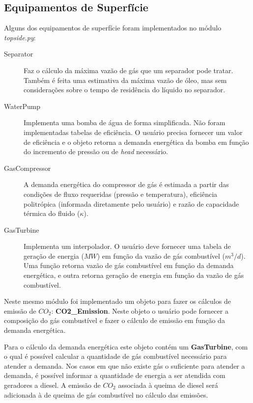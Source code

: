 \documentclass[final,5p]{elsarticle}
\numberwithin{equation}{section}
\begin{document}
    \subsection{Equipamentos de Superfície}

        Alguns dos equipamentos de superfície foram implementados no módulo \emph{topside.py}:

        \begin{description}
            \item[Separator] Faz o cálculo da máxima vazão de gás que um separador pode tratar. Também é feita uma estimativa da máxima vazão de óleo, mas sem considerações sobre o tempo de residência do líquido no separador.
            \item[WaterPump] Implementa uma bomba de água de forma simplificada. Não foram implementadas tabelas de eficiência. O usuário precisa fornecer um valor de eficiência e o objeto retorna a demanda energética da bomba em função do incremento de pressão ou de \emph{head} necessário.
            \item[GasCompressor] A demanda energética do compressor de gás é estimada a partir das condições de fluxo requeridas (pressão e temperatura), eficiência politrópica (informada diretamente pelo usuário) e razão de capacidade térmica do fluido ($\kappa$).
            \item[GasTurbine] Implementa um interpolador. O usuário deve fornecer uma tabela de geração de energia ($MW$) em função da vazão de gás combustível ($m^3/d$). Uma função retorna vazão de gás combustível em função da demanda energética, e outra retorna geração de energia em função da vazão de gás combustível.
        \end{description}

        Neste mesmo módulo foi implementado um objeto para fazer os cálculos de emissão de $CO_2$: \textbf{CO2\_Emission}. Neste objeto o usuário pode fornecer a composição do gás combustível e fazer o cálculo de emissão em função da demanda energética\cite{10.7122/151333-MS}.

        Para o cálculo da demanda energética este objeto contém um \textbf{GasTurbine}, com o qual é possível calcular a quantidade de gás combustível necessário para atender a demanda. Nos casos em que não existe gás o suficiente para atender a demanda, é possível informar a quantidade de energia a ser atendida com geradores a diesel. A emissão de $CO_2$ associada à queima de diesel será adicionada à de queima de gás combustível no cálculo das emissões.
\end{document}
